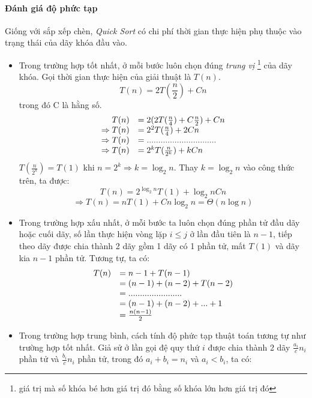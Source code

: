 \documentclass[8pt, a4paper]{article}
\begin{document}
\paragraph{Đánh giá độ phức tạp}
Giống với sắp xếp chèn, \emph{Quick Sort} có chi phí thời gian thực hiện phụ thuộc vào trạng thái của dãy khóa đầu vào.
\begin{itemize}
\item Trong trường hợp tốt nhất, ở mỗi bước luôn chọn đúng \emph{trung vị} \footnote{giá trị mà số khóa bé hơn giá trị đó bằng số khóa lớn hơn giá trị đó} của dãy khóa. Gọi thời gian thực hiện của giải thuật là $T(n)$.
$$T(n) = 2T(\frac{n}{2}) + Cn$$
trong đó C là hằng số.
\begin{displaymath}
\begin{array}{r l}
T(n) &= 2(2T(\frac{n}{4}) + C\frac{n}{2}) + Cn\\
\Rightarrow T(n) &= 2^2 T(\frac{n}{4}) + 2Cn\\
\Rightarrow T(n) &=..............................\\
\Rightarrow T(n) &= 2^k T(\frac{n}{2^k}) + kCn 
\end{array}
\end{displaymath}
$T(\frac{n}{2^k}) = T(1)$ khi $n = 2^k \Rightarrow k = \log_2 n$. Thay $k = \log_2 n$ vào công thức trên, ta được:\\
$$T(n) = 2^{\log_2{n}} T(1) + \log_2{n}Cn$$
$$\Rightarrow  T(n) = n T(1) + Cn\log_2{n} = \Theta(n \log n)$$
\item Trong trường hợp xấu nhất, ở mỗi bước ta luôn chọn đúng phần tử đầu dãy hoặc cuối dãy, số lần thực hiện vòng lặp $i\leq j$ ở lần đầu tiên là $n-1$, tiếp theo dãy được chia thành 2 dãy gồm 1 dãy có 1 phần tử, mất $T(1)$ và dãy kia $n-1$ phần tử. Tương tự, ta có:
\begin{displaymath}
\begin{array}{r l}
T(n) &= n-1 + T(n-1) \\
 &=  (n-1) + (n-2) + T(n-2)\\
 &= .......................\\
 &= (n-1) + (n-2) + ... + 1\\
 &= \frac{n(n-1)}{2}
\end{array}
\end{displaymath}
\item Trong trường hợp trung bình, cách tính độ phức tạp thuật toán tương tự như trường hợp tốt nhất. Giả sử ở lần gọi đệ quy thứ $i$ được chia thành 2 dãy $\frac{a_i}{c} n_i$ phần tử và $\frac{b_i}{c} n_i$ phần tử, trong đó $a_i + b_i = n_i$ và $a_i < b_i$, ta có:

\end{itemize}
\end{document}
